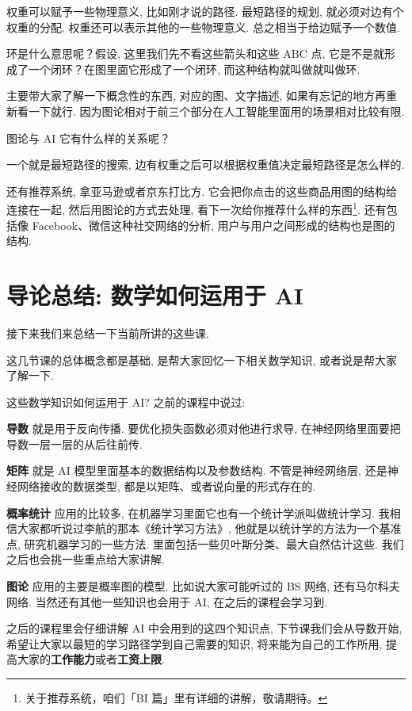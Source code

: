 权重可以赋予一些物理意义, 比如刚才说的路径. 最短路径的规划, 就必须对边有个权重的分配. 权重还可以表示其他的一些物理意义. 总之相当于给边赋予一个数值. 

环是什么意思呢？假设, 这里我们先不看这些箭头和这些 ABC 点, 它是不是就形成了一个闭环？在图里面它形成了一个闭环, 而这种结构就叫做就叫做环. 

主要带大家了解一下概念性的东西, 对应的图、文字描述, 如果有忘记的地方再重新看一下就行. 因为图论相对于前三个部分在人工智能里面用的场景相对比较有限. 

图论与 AI 它有什么样的关系呢？

一个就是最短路径的搜索, 边有权重之后可以根据权重值决定最短路径是怎么样的. 

还有推荐系统, 拿亚马逊或者京东打比方. 它会把你点击的这些商品用图的结构给连接在一起, 然后用图论的方式去处理, 看下一次给你推荐什么样的东西\footnote{关于推荐系统，咱们「BI 篇」里有详细的讲解，敬请期待。}. 还有包括像 Facebook、微信这种社交网络的分析, 用户与用户之间形成的结构也是图的结构. 

\hypertarget{数学如何运用于 AI}{}
\section{导论总结: 数学如何运用于 AI}

接下来我们来总结一下当前所讲的这些课. 

这几节课的总体概念都是基础, 是帮大家回忆一下相关数学知识, 或者说是帮大家了解一下. 

这些数学知识如何运用于 AI? 之前的课程中说过: 

\textbf{导数} 就是用于反向传播. 要优化损失函数必须对他进行求导, 在神经网络里面要把导数一层一层的从后往前传. 

\textbf{矩阵} 就是 AI 模型里面基本的数据结构以及参数结构. 不管是神经网络层, 还是神经网络接收的数据类型, 都是以矩阵、或者说向量的形式存在的. 

\textbf{概率统计} 应用的比较多, 在机器学习里面它也有一个统计学派叫做统计学习. 我相信大家都听说过李航的那本《统计学习方法》, 他就是以统计学的方法为一个基准点, 研究机器学习的一些方法. 里面包括一些贝叶斯分类、最大自然估计这些. 我们之后也会挑一些重点给大家讲解. 

\textbf{图论} 应用的主要是概率图的模型. 比如说大家可能听过的 BS 网络, 还有马尔科夫网络. 当然还有其他一些知识也会用于 AI, 在之后的课程会学习到. 

之后的课程里会仔细讲解 AI 中会用到的这四个知识点, 下节课我们会从导数开始, 希望让大家以最短的学习路径学到自己需要的知识, 将来能为自己的工作所用, 提高大家的\textbf{工作能力}或者\textbf{工资上限}. 